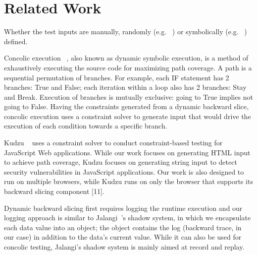 \section{Related Work}
Whether the test inputs are manually, randomly (e.g. ~\cite{artemis}) or symbolically (e.g. ~\cite{kudzu, jalangi}) defined.



Concolic execution ~\cite{cute}, also known as dynamic symbolic execution, is a method of exhaustively executing the source code for maximizing path coverage. 
A path is a sequential permutation of branches.  For example, each IF statement has 2 branches: True and False; each iteration within a loop also has 2 branches: Stay and Break. 
Execution of branches is mutually exclusive: going to True implies not going to False.
Having the constraints generated from a dynamic backward slice, concolic execution uses a constraint solver to generate input that would drive the execution of each condition towards a specific branch. 

Kudzu ~\cite{kudzu} uses a constraint solver to conduct constraint-based testing for JavaScript Web applications. 
While our work focuses on generating HTML input to achieve path coverage, Kudzu focuses on generating string input to detect security vulnerabilities in JavaScript applications. 
Our work is also designed to run on multiple browsers, while Kudzu runs on only the browser that supports its backward slicing component [11].

Dynamic backward slicing first requires logging the runtime execution and our logging approach is similar to Jalangi~\cite{jalangi}'s shadow system, in which we encapsulate each data value into an object; the object contains the log (backward trace, in our case) in addition to the data’s current value. While it can also be used for concolic testing, Jalangi’s shadow system is mainly aimed at record and replay.  
